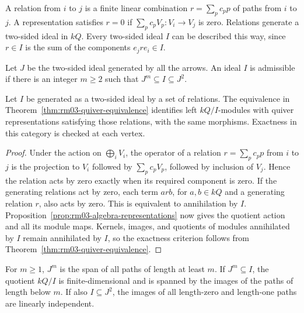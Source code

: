 \begin{definition}
\label{def:rm03-quiver-relations}
A relation from \(i\) to \(j\) is a finite linear combination
\(r=\sum_p c_p p\) of paths from \(i\) to \(j\). A representation
satisfies \(r=0\) if \(\sum_p c_p V_p\colon V_i\to V_j\) is zero.
Relations generate a two-sided ideal in \(kQ\). Every two-sided
ideal \(I\) can be described this way, since \(r\in I\) is the sum
of the components \(e_j r e_i\in I\).

Let \(J\) be the two-sided ideal generated by all the arrows.
An ideal \(I\) is admissible if there is an integer \(m\geq 2\)
such that \(J^m\subseteq I\subseteq J^2\).
\end{definition}

\begin{theorem}
\label{thm:rm03-bound-quiver-equivalence}
Let \(I\) be generated as a two-sided ideal by a set of relations.
The equivalence in Theorem~\ref{thm:rm03-quiver-equivalence}
identifies left \(kQ/I\)-modules with quiver representations
satisfying those relations, with the same morphisms. Exactness in
this category is checked at each vertex.
\end{theorem}

\begin{proof}
Under the action on \(\bigoplus_i V_i\), the operator of a
relation \(r=\sum_p c_p p\) from \(i\) to \(j\) is the projection
to \(V_i\) followed by \(\sum_p c_p V_p\), followed by inclusion
of \(V_j\). Hence the relation acts by zero exactly when its
required component is zero. If the generating relations act by
zero, each term \(arb\), for \(a,b\in kQ\) and a generating
relation \(r\), also acts by zero. This is equivalent to
annihilation by \(I\). Proposition~\ref{prop:rm03-algebra-representations}
now gives the quotient action and all its module maps. Kernels,
images, and quotients of modules annihilated by \(I\) remain
annihilated by \(I\), so the exactness criterion follows from
Theorem~\ref{thm:rm03-quiver-equivalence}.
\end{proof}

\begin{proposition}
\label{prop:rm03-admissible-finiteness}
For \(m\geq 1\), \(J^m\) is the span of all paths of length at
least \(m\). If \(J^m\subseteq I\), the quotient \(kQ/I\) is
finite-dimensional and is spanned by the images of the paths of
length below \(m\). If also \(I\subseteq J^2\), the images of all
length-zero and length-one paths are linearly independent.
\end{proposition}

